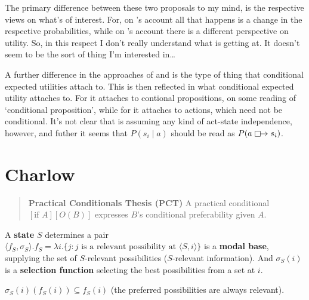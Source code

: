 \documentclass[10pt]{article}
\newcommand{\boxarrow}{%
  \mathrel{\mathop\Box}\mathrel{\mkern-2.5mu}\rightarrow
}
\begin{document}
The primary difference between these two proposals to my mind, is the respective views on what's of interest.
For, on \citeauthor{Sobel:1983aa}'s account all that happens is a change in the respective probabilities, while on \citeauthor{Weirich:1980aa}'s account there is a different perspective on utility.
So, in this respect I don't really understand what \citeauthor{Sobel:1983aa} is getting at.
It doesn't seem to be the sort of thing I'm interested in\dots

A further difference in the approaches of \citeauthor{Sobel:1983aa} and \citeauthor{Weirich:1980aa} is the type of thing that conditional expected utilities attach to.
This is then reflected in what conditional expected utility attaches to.
For \citeauthor{Sobel:1983aa} it attaches to contional propositions, on some reading of `conditional proposition', while for \citeauthor{Weirich:1980aa} it attaches to actions, which need not be conditional.
It's not clear that \citeauthor{Weirich:1980aa} is assuming any kind of act-state independence, however, and futher it seems that \(P(s_{i} \mid a)\) should be read as \(P(a \boxarrow s_{i})\).







\newpage

\section{Charlow}
\label{sec:charlow}


\begin{quote}
 \textbf{Practical Conditionals Thesis (PCT)} A practical conditional \([\text{if }A][O(B)]\) expresses \(B\)'s conditional preferability given \(A\).
\end{quote}


\begin{definition}
  A \textbf{state} \(S\) determines a pair \( \langle f_{S}, \sigma_{S} \rangle. f_{S} = \lambda i.\{j \colon j \text{ is a relevant possibility at } \langle S,i \rangle\}  \) is a \textbf{modal base}, supplying the set of \(S\)-relevant possibilities (\(S\)-relevant information). And \(\sigma_{S}(i)\) is a \textbf{selection function} selecting the best possibilities from a set at \(i\).
\end{definition}

\begin{assumption}[Realism]
  \(\sigma_{S}(i)(f_{S}(i)) \subseteq f_{S}(i)\) (the preferred possibilities are always relevant).
\end{assumption}
\end{document}
